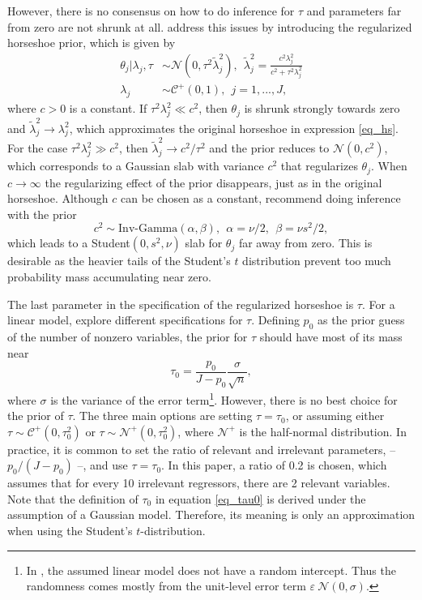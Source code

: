 However, there is no consensus on how to do inference for $\tau$ and parameters far from zero are not shrunk at all.
\cite{piironen_sparsity_2017} address this issues by introducing the regularized horseshoe prior, which is given by
\begin{equation}
    \begin{split}
        \theta_j | \lambda_j, \tau & \sim \mathcal N (0, \tau^2 \tilde \lambda^2_j),
        ~~ \tilde \lambda_j^2 = \displaystyle \frac{c^2 \lambda^2_j}{c^2 + \tau^2 \lambda_j^2}\\
        \lambda_j & \sim \mathcal C^+ (0, 1), ~~ j = 1,..., J,
    \end{split}
\end{equation}
where $c > 0$ is a constant.
If $\tau^2\lambda^2_j \ll c^2$, then $\theta_j$ is shrunk strongly towards zero and $\tilde \lambda^2_j \rightarrow \lambda^2_j$, which approximates the original horseshoe in expression \ref{eq_hs}.
For the case $\tau^2\lambda^2_j \gg c^2$, then $\tilde \lambda^2_j \rightarrow c^2/\tau^2$ and the prior reduces to $\mathcal N(0, c^2)$, which corresponds to a Gaussian slab with variance $c^2$ that regularizes $\theta_j$.
When $c \rightarrow \infty$ the regularizing effect of the prior disappears, just as in the original horseshoe.
Although $c$ can be chosen as a constant, \cite{piironen_sparsity_2017} recommend doing inference with the prior
\begin{equation*}
    c^2 \sim \text{Inv-Gamma}(\alpha, \beta), ~~ \alpha = \nu/2, ~~ \beta = \nu s^2/2,
\end{equation*}
which leads to a Student$(0, s^2, \nu)$ slab for $\theta_j$ far away from zero.
This is desirable as the heavier tails of the Student's $t$ distribution prevent too much probability mass accumulating near zero.

The last parameter in the specification of the regularized horseshoe is $\tau$.
For a linear model, \cite{piironen_sparsity_2017} explore different specifications for $\tau$.
Defining $p_0$ as the prior guess of the number of nonzero variables, the prior for $\tau$ should have most of its mass near
\begin{equation}
    \displaystyle \tau_0 = \frac{p_0}{J-p_0}\frac{\sigma}{\sqrt n},
    \label{eq_tau0}
\end{equation}
where $\sigma$ is the variance of the error term\footnote{In \cite{piironen_sparsity_2017}, the assumed linear model does not have a random intercept. Thus the randomness comes mostly from the unit-level error term $\varepsilon ~ \mathcal N (0, \sigma)$.}.
However, there is no best choice for the prior of $\tau$. The three main options are setting $\tau = \tau_0$, or assuming either $\tau \sim \mathcal C^+(0, \tau_0^2)$ or $\tau \sim \mathcal N^+(0, \tau_0^2)$, where $\mathcal{N^+}$ is the half-normal distribution.
In practice, it is common to set the ratio of relevant and irrelevant parameters, – $p_0/(J - p_0)$ –, and use $\tau = \tau_0$.
In this paper, a ratio of 0.2 is chosen, which assumes that for every 10 irrelevant regressors, there are 2 relevant variables.
Note that the definition of $\tau_0$ in equation \ref{eq_tau0} is derived under the assumption of a Gaussian model.
Therefore, its meaning is only an approximation when using the Student's $t$-distribution.

